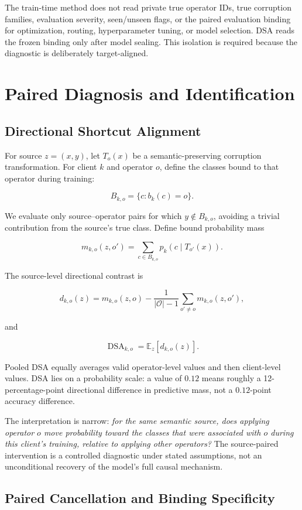\documentclass[10pt,twocolumn]{article}
\begin{document}
The train-time method does not read private true operator IDs, true corruption families, evaluation severity, seen/unseen flags, or the paired evaluation binding for optimization, routing, hyperparameter tuning, or model selection. DSA reads the frozen binding only after model sealing. This isolation is required because the diagnostic is deliberately target-aligned.

\section{Paired Diagnosis and Identification}

\subsection{Directional Shortcut Alignment}

For source \(z=(x,y)\), let \(T_o(x)\) be a semantic-preserving corruption transformation. For client \(k\) and operator \(o\), define the classes bound to that operator during training:

\[
B_{k,o}=\{c:b_k(c)=o\}.
\]

We evaluate only source--operator pairs for which \(y\notin B_{k,o}\), avoiding a trivial contribution from the source's true class. Define bound probability mass

\[
m_{k,o}(z,o')=\sum_{c\in B_{k,o}}p_k(c\mid T_{o'}(x)).
\]

The source-level directional contrast is

\[
d_{k,o}(z)=m_{k,o}(z,o)
-\frac{1}{|\mathcal O|-1}\sum_{o'\neq o}m_{k,o}(z,o'),
\]

and

\[
\operatorname{DSA}_{k,o}=\mathbb E_z[d_{k,o}(z)].
\]

Pooled DSA equally averages valid operator-level values and then client-level values. DSA lies on a probability scale: a value of \(0.12\) means roughly a 12-percentage-point directional difference in predictive mass, not a \(0.12\)-point accuracy difference.

The interpretation is narrow: \emph{for the same semantic source, does applying operator \(o\) move probability toward the classes that were associated with \(o\) during this client's training, relative to applying other operators?} The source-paired intervention is a controlled diagnostic under stated assumptions, not an unconditional recovery of the model's full causal mechanism.

\subsection{Paired Cancellation and Binding Specificity}
\end{document}
